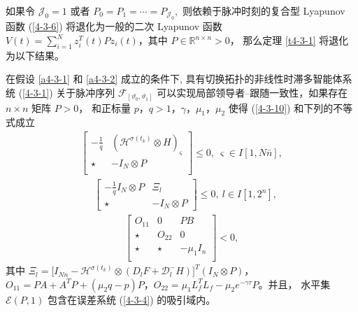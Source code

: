 如果令 $\mathcal{J}_0=1$ 或者 $P_0=P_1=\cdots=P_{\mathcal{J}_0},$ 则依赖于脉冲时刻的复合型 Lyapunov 函数 (\ref{4-3-6}) 将退化为一般的二次 Lyapunov 函数 
$
V(t)=\sum\limits_{i=1}^{N}  z^T_i(t)P z_i(t)$，其中 $ P\in\mathbb{R}^{n\times n}>0 
$， 那么定理 \ref{t4-3-1} 将退化为以下结果。
\begin{theorem}\label{t4-3-2}
    在假设 \ref{a4-3-1} 和 \ref{a4-3-2} 成立的条件下, 具有切换拓扑的非线性时滞多智能体系统 (\ref{4-3-1}) 关于脉冲序列 $\mathscr{F}_{[\vartheta_0,\vartheta_1]}$ 可以实现局部领导者--跟随一致性，如果存在 $n\times n$ 矩阵 $P>0$， 和正标量 $p$，$q>1$，$\gamma$，$\mu_1$，$\mu_2$ 使得 (\ref{4-3-10}) 和下列的不等式成立 
    \begin{align}\label{4-3-22} 
    \left[ \begin{array}{cc}
    -\frac{1}{q}&  (\mathcal{H}^{\sigma(t_k)}\otimes H)_\varsigma\\
    \star&-I_N\otimes P  \\
    \end{array}
    \right]\leq  0,\ \varsigma\in I[1,N\bar{n} ],
    \end{align} 
    \begin{align} \label{4-3-23} 
    &\left[ \begin{array}{cc}
    -\frac{1}{q}I_N\otimes P& \varXi_{l}\\
    \star&-I_N\otimes P
    \end{array}
    \right]\leq0,\ l\in I[1,2^n],
    \end{align}
    \begin{align}\label{4-3-24} 
    \left[ \begin{array}{ccc}
    O_{11} &0&  P B  \\
    \star&O_{22 } &0 \\
    \star&\star&-\mu_{1 }I_n \\
    \end{array}
    \right]< 0,
    \end{align}   
    其中
   $
    \varXi_{l}=  [I_{Nn}- \mathcal{H}^{\sigma(t_k)} \otimes (D_{l}F+\mathscr{D}_{l}^-H)\big]^T(I_N\otimes P)$，$  
    O_{11 }= 
     P A+A^TP +(\mu_{2 } q-p)P$，$ 
    O_{22 }=  \mu_{1 }L^T_f L_f-\mu_{2 }
    e^{-\gamma\tau} P       
    $。并且，
   水平集 $ \mathscr{E} ( P,1)$ 包含在误差系统 (\ref{4-3-4}) 的吸引域内。
\end{theorem} 

